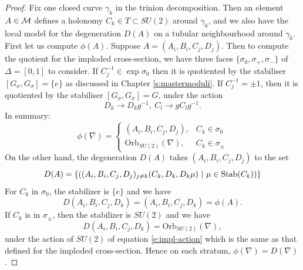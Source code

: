 	\begin{proof}
		Fix one closed curve $\gamma_k$ in the trinion decomposition. Then an element $A\in \mathcal{M}$ defines a holonomy $C_k\in T\subset SU(2)$ around $\gamma_k$, and we also have the local model for the degeneration $D(A)$ on a tubular neighbourhood around $\gamma_k$. First let us compute $\phi(A)$. Suppose $A = (A_i,B_i,C_j,D_j)$. Then to compute the quotient for the imploded cross-section, we have three faces $\{\sigma_0, \sigma_+, \sigma_-\}$ of $\Delta = [0,1]$ to consider. If $C_j^{-1} \in \exp \sigma_0$ then it is quotiented by the stabiliser $[G_\sigma,G_\sigma] = \{e\}$ as discussed in Chapter \ref{s:mastermoduli}. If $C_j^{-1} = \pm 1$, then it is quotiented by the stabiliser $[G_\sigma, G_\sigma] = G$, under the action
		\begin{equation}
			D_k \to D_k g^{-1},~ C_l \to g C_l g^{-1}.
		\end{equation}
		In summary:
		\begin{equation}
			\phi(\nabla) = \begin{cases}
				(A_i,B_i,C_j,D_j), & C_k \in \sigma_0\\
				\text{Orb}_{SU(2)}(\nabla) , & C_k \in \sigma_\pm
			\end{cases}
		\end{equation}
		On the other hand, the degeneration $D(A)$ takes $(A_i,B_i,C_j,D_j)$ to the set
		\begin{equation}
			D(A) = \left\{
			\left(
			(A_i,B_i,C_j,D_j)_{j\neq k} (C_k, D_k, D_k\mu) ~|~ \mu \in \text{Stab}(C_k)
			\right)
			\right\}
		\end{equation}
		For $C_k$ in $\sigma_0$, the stabilizer is $\{e\}$ and we have
		\begin{equation}
			D(A_i,B_i,C_j,D_k) = (A_i,B_i,C_j,D_k) = \phi(A).
		\end{equation}
		If $C_k$ is in $\sigma_\pm$, then the stabilizer is $SU(2)$ and we have
		\begin{equation}
			D(A_i,B_i,C_j,D_k) = \text{Orb}_{SU(2)}(\nabla),
		\end{equation}
		under the action of $SU(2)$ of equation \ref{e:impl-action} which is the same as that defined for the imploded cross-section. Hence on each stratum, $\phi(\nabla) = D(\nabla)$. 
		

\end{proof}
